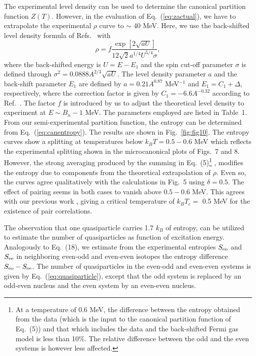 The experimental level density can be used to determine the canonical partition function $Z(T)$. However, in the evaluation of Eq.\ (\ref{eq:zactual}), we have to extrapolate the experimental $\rho$ curve to $\sim$ 40 MeV. Here, we use the back-shifted level density formula of Refs.~\cite{23,24} with
\begin{equation}
\rho=f\frac{\exp [2\sqrt{aU}]}{12\sqrt{2}a^{1/4}U^{5/4}\sigma},
\end{equation}
where the back-shifted energy is $U=E-E_1$ and the spin cut-off parameter $\sigma$ is defined through $\sigma^2 = 0.0888 A^{2/3}\sqrt{aU}$. The level density parameter $a$ and the back-shift parameter $E_1$ are defined by $a=0.21A^{0.87}$ MeV$^{-1}$ and $E_1 = C_1 + \Delta$, respectively, where the correction factor is given by $C_1=-6.6A^{-0.32}$ according to Ref.~\cite{24}. The factor $f$ is introduced by us to adjust the theoretical level density to experiment at $E \sim B_n-1$ MeV. The parameters employed are listed in Table~1. 
From our semi-experimental partition function, the entropy can be determined from Eq.\ (\ref{eq:canentropy}). The results are shown in Fig.\ \ref{fig:fig10}. The entropy curves show a splitting at temperatures below  $k_BT = 0.5 - 0.6$ MeV which reflects the experimental splitting shown in the microcanonical plots of Figs.~7 and 8. However, the strong averaging produced by the summing in Eq.~(5)\footnote{At a temperature of 0.6 MeV, the difference between the 
entropy obtained from the data (which is the input to the
canonical partition function of Eq.~(5)) 
and that which includes the data and the back-shifted Fermi gas 
model is less than 10\%.
The relative difference between the odd and the even systems is however
less affected.}
, modifies the entropy due to components from the theoretical extrapolation of $\rho$. Even so, the curves agree qualitatively with the calculations in Fig.~5 using $\delta = 0.5$. The effect of pairing seems in both cases to vanish above $0.5 - 0.6$ MeV. This agrees with our previous work \cite{10}, giving a critical temperature of $k_BT_c =$ 0.5 MeV for the existence of pair correlations.

The observation that one quasiparticle carries 1.7 $k_B$ of entropy, can be utilized to estimate the number of quasiparticles as function of excitation energy. Analogously to Eq.~(18), we estimate from the experimental entropies $S_{\rm eo}$ and $S_{\rm ee}$ in neighboring even-odd and even-even isotopes the entropy difference  $S_{\rm eo} - S_{\rm ee}$. The number of quasiparticles in the even-odd and even-even systems is given by Eq.\ (\ref{eq:quasiparticle}), except that the odd system is replaced by an odd-even nucleus and the even system by an even-even nucleus. 

